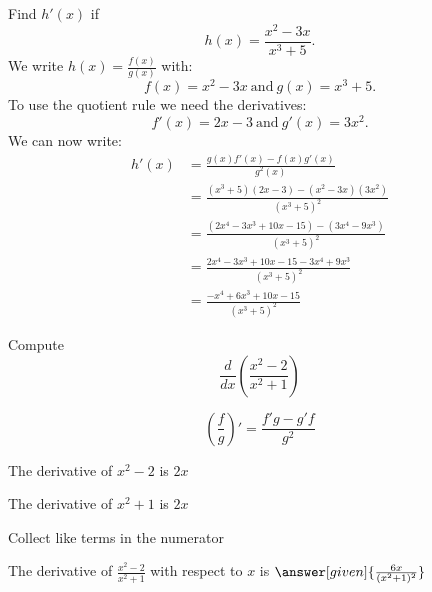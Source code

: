\documentclass{ximera}
\begin{document}
\begin{example} %
Find $h'(x)$ if 
\[
h(x) = \frac{x^2 - 3x}{x^3 +5}.
\]
We write $\displaystyle{h(x) = \frac{f(x)}{g(x)}}$ 
with:
\[f(x) =x^2 - 3x \ \text{and} \  g(x)= x^3 + 5.\]
 To use the quotient rule we need the derivatives:
\[f'(x) = 2x-3 \ \text{and} \  g'(x) = 3x^2.\]
We can now write: 
\begin{align*}
h'(x) &= \frac{g(x)f'(x) - f(x)g'(x)}{g^2(x)}\\
&= \frac{(x^3 + 5)(2x-3) - (x^2-3x)(3x^2)}{(x^3 + 5)^2}\\
&= \frac{(2x^4 -3x^3 + 10x - 15) -(3x^4-9x^3)}{(x^3 + 5)^2}\\
&= \frac{2x^4 -3x^3 + 10x - 15 -3x^4+9x^3}{(x^3 + 5)^2}\\
&= \frac{-x^4 +6x^3 + 10x - 15}{(x^3 + 5)^2}
\end{align*}
\end{example}


\begin{center}
\begin{foldable}
\end{foldable}
\end{center}


\begin{question} %
  Compute
  \[
  \frac{d}{dx} \left(\frac{x^2 - 2}{x^2 + 1}\right)
  \]
  
    \begin{hint}
      \[\left(\frac{f}{g}\right)' = \frac{f'g-g'f}{g^2}\]
    \end{hint}
    \begin{hint}
      The derivative of $x^2 - 2$ is $2x$
    \end{hint}
    \begin{hint}
      The derivative of $x^2 + 1$ is $2x$
    \end{hint}
    \begin{hint}
      Collect like terms in the numerator
    \end{hint}
		The derivative of $\frac{x^2 - 2}{x^2 + 1}$ with respect to $x$ is
		 $\answer[given]{\frac{6x}{(x^2 + 1)^2}}$
		
\end{question}
\end{document}
